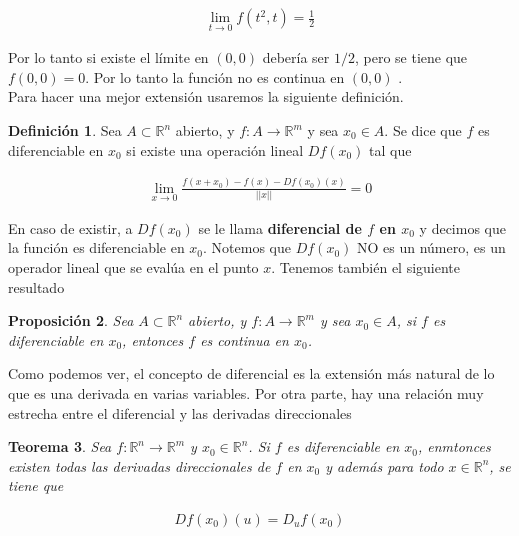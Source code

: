 \documentclass{article}
\theoremstyle{plain}
\newtheorem{thm}{Teorema}[section]
\newtheorem{prop}[thm]{Proposición}
\theoremstyle{definition}
\newtheorem{defin}[thm]{Definición}
\begin{document}
\begin{align*}
   \lim_{t \to 0} f(t^2,t) =\frac{1}{2}
\end{align*}

Por lo tanto si existe el límite en $(0,0)$  debería ser $1/2$, pero se tiene que $f(0,0)=0$. Por lo tanto la función no es continua en $(0,0)$ . \\

Para hacer una mejor extensión usaremos la siguiente definición. \\


\begin{defin}Sea $A \subset \mathbb{R}^n$ abierto, y $f: A  \to \mathbb{R}^m$ y sea $x_0 \in A$. Se dice que $f$ es diferenciable en $x_0$ si existe una operación lineal $Df(x_0)$ tal que
\end{defin}

\begin{align*}
    \lim_{x \to 0} \frac{f(x+x_0)-f(x)-Df(x_0)(x)}{|| x ||} = 0
\end{align*}

En caso de existir, a $Df(x_0)$ se le llama \textbf{diferencial de $f$ en $x_0$} y decimos que la función es diferenciable en $x_0$. Notemos que $Df(x_0)$ NO es un número, es un operador lineal que se evalúa en el punto $x$. Tenemos también el siguiente resultado \\

\begin{prop}Sea $A \subset \mathbb{R}^n$ abierto, y $f: A  \to \mathbb{R}^m$ y sea $x_0 \in A$, si $f$ es diferenciable en $x_0$, entonces $f$ es continua en $x_0$. \\
\end{prop}


Como podemos ver, el concepto de diferencial es la extensión más natural de lo que es una derivada en varias variables. Por otra parte, hay una relación muy estrecha entre el diferencial y las derivadas direccionales \\

\begin{thm}Sea $f: \mathbb{R}^n \to \mathbb{R}^m$ y $x_0 \in \mathbb{R}^n$. Si $f$ es diferenciable en $x_0$, enmtonces existen todas las derivadas direccionales de $f$ en $x_0$ y además para todo $x \in \mathbb{R}^n$, se tiene que
\end{thm}

\begin{align*}
    Df(x_0) (u) = D_uf(x_0)
\end{align*}
\end{document}
